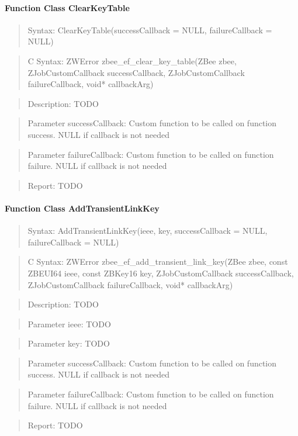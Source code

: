 \paragraph{Function Class ClearKeyTable}
\begin{quote}Syntax: ClearKeyTable(successCallback = NULL, failureCallback = NULL)\end{quote}
\begin{quote}C Syntax: ZWError zbee\_ef\_clear\_key\_table(ZBee zbee, ZJobCustomCallback successCallback, ZJobCustomCallback failureCallback, void* callbackArg)\end{quote}
\begin{quote}Description: TODO\end{quote}
\begin{quote}Parameter successCallback: Custom function to be called on function success. NULL if callback is not needed\end{quote}
\begin{quote}Parameter failureCallback: Custom function to be called on function failure. NULL if callback is not needed\end{quote}
\begin{quote}Report: TODO\end{quote}

\paragraph{Function Class AddTransientLinkKey}
\begin{quote}Syntax: AddTransientLinkKey(ieee, key, successCallback = NULL, failureCallback = NULL)\end{quote}
\begin{quote}C Syntax: ZWError zbee\_ef\_add\_transient\_link\_key(ZBee zbee, const ZBEUI64 ieee, const ZBKey16 key, ZJobCustomCallback successCallback, ZJobCustomCallback failureCallback, void* callbackArg)\end{quote}
\begin{quote}Description: TODO\end{quote}
\begin{quote}Parameter ieee: TODO\end{quote}
\begin{quote}Parameter key: TODO\end{quote}
\begin{quote}Parameter successCallback: Custom function to be called on function success. NULL if callback is not needed\end{quote}
\begin{quote}Parameter failureCallback: Custom function to be called on function failure. NULL if callback is not needed\end{quote}
\begin{quote}Report: TODO\end{quote}

